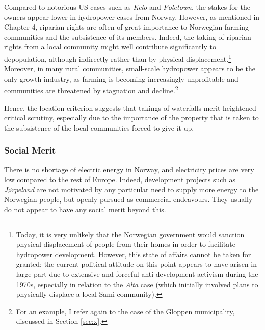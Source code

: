 Compared to notorious US cases such as {\it Kelo} and {\it Poletown}, the stakes for the owners appear lower in hydropower cases from Norway. However, as mentioned in Chapter 4, riparian rights are often of great importance to Norwegian farming communities and the subsistence of its members. Indeed, the taking of riparian rights from a local community might well contribute significantly to depopulation, although indirectly rather than by physical displacement.\footnote{Today, it is very unlikely that the Norwegian government would sanction physical displacement of people from their homes in order to facilitate hydropower development. However, this state of affairs cannot be taken for granted; the current political attitude on this point appears to have arisen in large part due to extensive and forceful anti-development activism during the 1970s, especially in relation to the {\it Alta} case (which initially involved plans to physically displace a local Sami community).} Moreover, in many rural communities, small-scale hydropower appears to be the only growth industry, as farming is becoming increasingly unprofitable and communities are threatened by stagnation and decline.\footnote{For an example, I refer again to the case of the Gloppen municipality, discussed in Section \ref{sec:x}.}

Hence, the location criterion suggests that takings of waterfalls merit heightened critical scrutiny, especially due to the importance of the property that is taken to the subsistence of the local communities forced to give it up.

\subsubsection{Social Merit}


There is no shortage of electric energy in Norway, and electricity prices are very low compared to the rest of Europe. Indeed, development projects such as {\it Jørpeland} are not motivated by any particular need to supply more energy to the Norwegian people, but openly pursued as commercial endeavours. They usually do not appear to have any social merit beyond this.

